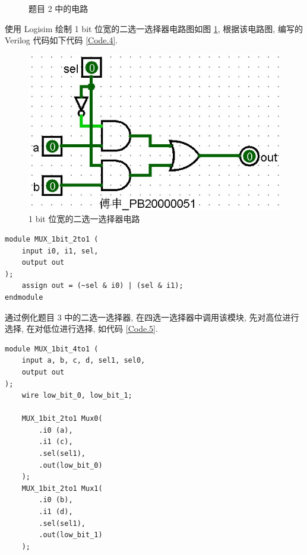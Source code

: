 \documentclass[UTF8,fontset=fandol]{ctexart}
\begin{document}
\begin{ExQuestions}
\begin{figure}[H]
{    }
    \caption{题目 2 中的电路}
  \end{figure}
  \newpage
  \question 使用 Logisim 绘制 1 bit 位宽的二选一选择器电路图如图 \ref{Fig.6}, 根据该电路图, 编写的 Verilog 代码如下代码 \ref{Code.4}.
  \begin{figure}[H]
    \centering
    \label{Fig.6}
    \includegraphics[width = .5\linewidth]{images/Fig.6.jpg}
    \caption{1 bit 位宽的二选一选择器电路}
  \end{figure}
  \begin{lstlisting}[style=verilogstyle, caption={1 bit 位宽的二选一选择器}, label={Code.4}]
module MUX_1bit_2to1 (
    input i0, i1, sel,
    output out
);
    assign out = (~sel & i0) | (sel & i1);
endmodule
  \end{lstlisting}

  \question 通过例化题目 3 中的二选一选择器, 在四选一选择器中调用该模块, 先对高位进行选择, 在对低位进行选择, 如代码 \ref{Code.5}.
  \begin{lstlisting}[style=verilogstyle, caption={1 bit 位宽的四选一选择器}, label={Code.5}]
module MUX_1bit_4to1 (
    input a, b, c, d, sel1, sel0,
    output out
);
    wire low_bit_0, low_bit_1;

    MUX_1bit_2to1 Mux0(
        .i0 (a),
        .i1 (c),
        .sel(sel1),
        .out(low_bit_0)
    );
    MUX_1bit_2to1 Mux1(
        .i0 (b),
        .i1 (d),
        .sel(sel1),
        .out(low_bit_1)
    );
    

\end{lstlisting}
\end{ExQuestions}
\end{document}
